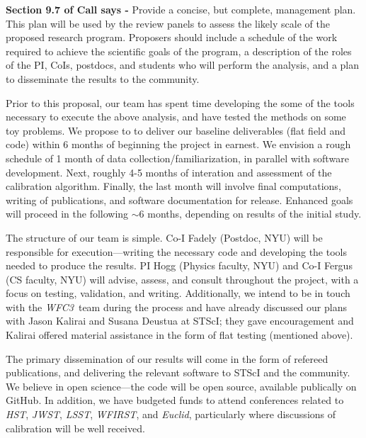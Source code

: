 \documentclass[12pt]{article}
\newcommand{\project}[1]{\textsl{#1}}
\newcommand{\HST}{\project{HST}}
\newcommand{\WFC}{\project{WFC3}}
\begin{document}
{\color{red} \textbf{Section 9.7 of Call says -} Provide a concise, but complete, 
management plan. This plan will be used by the review panels to assess 
the likely scale of the proposed research program. Proposers should 
include a schedule of the work required to achieve the scientific
goals of the program, a description of the roles of the PI, CoIs,
postdocs, and students who will perform the analysis, and a plan to 
disseminate the results to the community. }

Prior to this proposal, our team has spent time developing the some of
the tools necessary to execute the above analysis, and have tested the
methods on some toy problems.  We propose to to deliver our baseline
deliverables (flat field and code) within 6 months of beginning the
project in earnest.  We envision a rough schedule of 1 month of data
collection/familiarization, in parallel with software development.
Next, roughly 4-5 months of interation and assessment of the
calibration algorithm.  Finally, the last month will involve final
computations, writing of publications, and software documentation for
release. Enhanced goals will proceed in the following $\sim6$ months,
depending on results of the initial study.

The structure of our team is simple.  Co-I Fadely (Postdoc, NYU) will
be responsible for execution---writing the necessary code and
developing the tools needed to produce the results.  PI Hogg (Physics
faculty, NYU) and Co-I Fergus (CS faculty, NYU) will advise, assess,
and consult throughout the project, with a focus on testing,
validation, and writing.  Additionally, we intend to be in touch with
the \WFC\ team during the process and have already discussed our plans
with Jason Kalirai and Susana Deustua at STScI; they gave
encouragement and Kalirai offered material assistance in the form of
flat testing (mentioned above).

The primary dissemination of our results will come in the form of
refereed publications, and delivering the relevant software to STScI
and the community.  We believe in open science---the code will be open
source, available publically on GitHub.  In addition, we have budgeted
funds to attend conferences related to \HST, \project{JWST},
\project{LSST}, \project{WFIRST}, and \project{Euclid}, particularly
where discussions of calibration will be well received.


%
%
%
\pasthstusage  %
\end{document}
